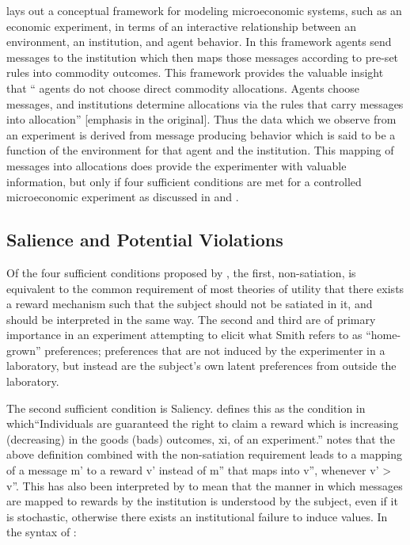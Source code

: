 \documentclass[../main.tex]{subfiles}
\begin{document}
\textcite{Smith1982} lays out a conceptual framework for modeling microeconomic systems, such as an economic experiment, in terms of an interactive relationship between an environment, an institution, and agent behavior.
In this framework agents send messages to the institution which then maps those messages according to pre-set rules into commodity outcomes.
This framework provides the valuable insight that \enquote{\textelp{} agents do not choose direct commodity allocations.
Agents choose messages, and institutions determine allocations via the rules that carry messages into allocation} [emphasis in the original]\parencite[926]{Smith1982}.
Thus the data which we observe from an experiment is derived from message producing behavior which is said to be a function of the environment for that agent and the institution.
This mapping of messages into allocations does provide the experimenter with valuable information, but only if four sufficient conditions are met for a controlled microeconomic experiment as discussed in \textcite{Smith1982} and \textcite{Harrison1989}.

\subsection{Salience and Potential Violations}

Of the four sufficient conditions proposed by \textcite{Smith1982}, the first, non-satiation, is equivalent to the common requirement of most theories of utility that there exists a reward mechanism such that the subject should not be satiated in it, and should be interpreted in the same way.
The second and third are of primary importance in an experiment attempting to elicit what Smith refers to as \enquote{home-grown} preferences; preferences that are not induced by the experimenter in a laboratory, but instead are the subject's own latent preferences from outside the laboratory.


The second sufficient condition is Saliency.
\textcite[931]{Smith1982} defines this as the condition in which\enquote{Individuals are guaranteed the right to claim a reward which is increasing (decreasing) in the goods (bads) outcomes, xi, of an experiment.}
\textcite[223]{Harrison1994} notes that the above definition combined with the non-satiation requirement leads to a mapping of a message m' to a reward v' instead of m'' that maps into v'', whenever v' > v''.
This has also been interpreted by \textcite{Bruner2011} to mean that the manner in which messages are mapped to rewards by the institution is understood by the subject, even if it is stochastic, otherwise there exists an institutional failure to induce values.
In the syntax of \textcite{Smith1982}⁠⁠:
\end{document}
